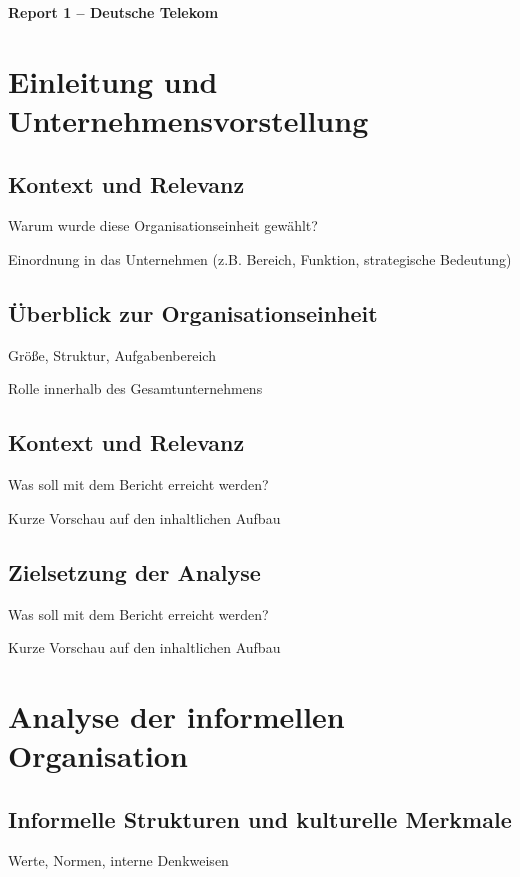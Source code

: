 \documentclass[12pt,a4paper]{article}
\begin{document}
	
	\setcounter{page}{1}
	\begin{center}
		\textbf{Report 1 – Deutsche Telekom}
	\end{center}
	
	
	
	\section{Einleitung und Unternehmensvorstellung}
	
	\subsection{Kontext und Relevanz}
	Warum wurde diese Organisationseinheit gewählt?
	
	Einordnung in das Unternehmen (z.B. Bereich, Funktion, strategische Bedeutung)
	
	\subsection{ Überblick zur Organisationseinheit}
	Größe, Struktur, Aufgabenbereich
	
	Rolle innerhalb des Gesamtunternehmens
	\subsection{Kontext und Relevanz}
	Was soll mit dem Bericht erreicht werden?
	
	Kurze Vorschau auf den inhaltlichen Aufbau
	
	\subsection{Zielsetzung der Analyse}
	Was soll mit dem Bericht erreicht werden?
	
	Kurze Vorschau auf den inhaltlichen Aufbau
	
	
	\section{Analyse der informellen Organisation}
	\subsection{Informelle Strukturen und kulturelle Merkmale}
	Werte, Normen, interne Denkweisen
	
\end{document}
